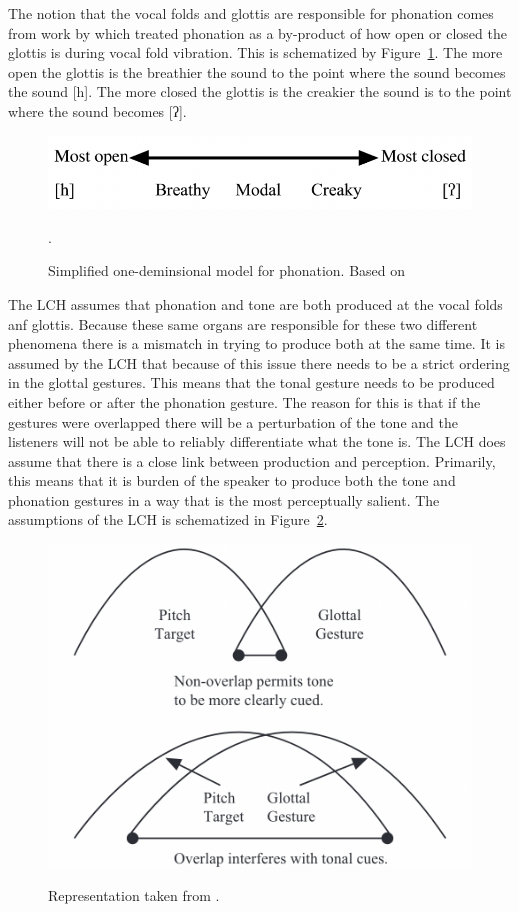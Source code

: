 \documentclass[12pt, letterpaper]{article}
\begin{document}
The notion that the vocal folds and glottis are responsible for phonation comes from work by \citet{ladefogedPreliminariesLinguisticPhonetics1971,gordonPhonationTypesCrosslinguistic2001} which treated phonation as a by-product of how open or closed the glottis is during vocal fold vibration. This is schematized by Figure~\ref{fig:Phonation}. The more open the glottis is the breathier the sound to the point where the sound becomes the sound [h]. The more closed the glottis is the creakier the sound is to the point where the sound becomes [ʔ]. 
\begin{figure}[!ht]
	\centering
	\includegraphics[width=.6\textwidth]{../Phonation.png}
	\caption{Simplified one-deminsional model for phonation. Based on \citet{ladefogedPreliminariesLinguisticPhonetics1971,gordonPhonationTypesCrosslinguistic2001}}.
	\label{fig:Phonation}
\end{figure}
\vspace{-2ex}

The LCH assumes that phonation and tone are both produced at the vocal folds anf glottis. Because these same organs are responsible for these two different phenomena there is a mismatch in trying to produce both at the same time. It is assumed by the LCH that because of this issue there needs to be a strict ordering in the glottal gestures. This means that the tonal gesture needs to be produced either before or after the phonation gesture. The reason for this is that if the gestures were overlapped there will be a perturbation of the tone and the listeners will not be able to reliably differentiate what the tone is. The LCH does assume that there is a close link between production and perception. Primarily, this means that it is burden of the speaker to produce both the tone and phonation gestures in a way that is the most perceptually salient. The assumptions of the LCH is schematized in Figure~\ref{fig:GlottalGestures}.

\begin{figure}[!ht]
	\centering
	\includegraphics[width=.5\textwidth]{../Gestures.png}
	\label{fig:GlottalGestures}
	\caption{Representation taken from \citet{dicanioCoarticulationToneGlottal2012}.}
\end{figure}
\end{document}
